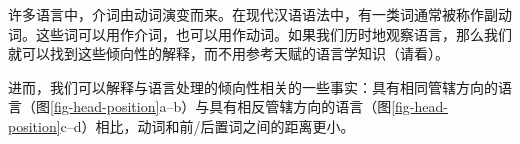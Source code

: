 许多语言中，介词由动词演变而来。在现代汉语语法中，有一类词通常被称作副动词。这些词可以用作介词，也可以用作动词。如果我们历时地观察语言，那么我们就可以找到这些倾向性的解释，而不用参考天赋的语言学知识（请看\citealp[]{EL2009a}）。

进而，我们可以解释与语言处理的倾向性相关的一些事实：具有相同管辖方向的语言（图\ref{fig-head-position}a--b）与具有相反管辖方向的语言（图\ref{fig-head-position}c--d）相比，动词和前/后置词之间的距离更小。
